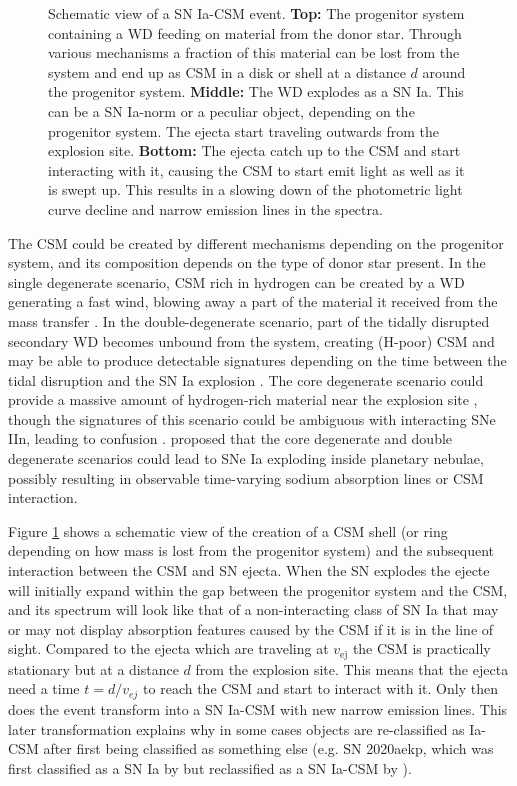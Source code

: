 \documentclass[a4paper,oneside,12pt, class=Latex/Classes/PhDthesisPSnPDF, crop=false]{standalone}
\begin{document}
\begin{figure}
    \caption{Schematic view of a SN Ia-CSM event. \textbf{Top:} The progenitor system containing a WD feeding on material from the donor star. Through various mechanisms a fraction of this material can be lost from the system and end up as CSM in a disk or shell at a distance $d$ around the progenitor system. \textbf{Middle:} The WD explodes as a SN Ia. This can be a SN Ia-norm or a peculiar object, depending on the progenitor system. The ejecta start traveling outwards from the explosion site. \textbf{Bottom:} The ejecta catch up to the CSM and start interacting with it, causing the CSM to start emit light as well as it is swept up. This results in a slowing down of the photometric light curve decline and narrow emission lines in the spectra.}
    \label{Ia-CSM_mod}
\end{figure}

The CSM could be created by different mechanisms depending on the progenitor system, and its composition depends on the type of donor star present. In the single degenerate scenario, CSM rich in hydrogen can be created by a WD generating a fast wind, blowing away a part of the material it received from the mass transfer \citep{single_degen_CSM_gen}. In the double-degenerate scenario, part of the tidally disrupted secondary WD becomes unbound from the system, creating (H-poor) CSM and may be able to produce detectable signatures depending on the time between the tidal disruption and the SN Ia explosion \citep{Double_degen_CSM_gen}. The core degenerate scenario could provide a massive amount of hydrogen-rich material near the explosion site \citep[e.g. for SN 2014J,][]{2014J_core_deg}, though the signatures of this scenario could be ambiguous with interacting SNe IIn, leading to confusion \citep{2012ca_Ia-CSM/IIn}. \citet{snips} proposed that the core degenerate and double degenerate scenarios could lead to SNe Ia exploding inside planetary nebulae, possibly resulting in observable time-varying sodium absorption lines or CSM interaction.

Figure \ref{Ia-CSM_mod} shows a schematic view of the creation of a CSM shell (or ring depending on how mass is lost from the progenitor system) and the subsequent interaction between the CSM and SN ejecta. When the SN explodes the ejecte will initially expand within the gap between the progenitor system and the CSM, and its spectrum will look like that of a non-interacting class of SN Ia that may or may not display absorption features caused by the CSM if it is in the line of sight. Compared to the ejecta which are traveling at $v_\text{ej}$ the CSM is practically stationary but at a distance $d$ from the explosion site. This means that the ejecta need a time $t=d/v_{ej}$ to reach the CSM and start to interact with it. Only then does the event transform into a SN Ia-CSM with new narrow emission lines. This later transformation explains why in some cases objects are re-classified as Ia-CSM after first being classified as something else (e.g. SN 2020aekp, which was first classified as a SN Ia by \citealt{2020aekp_1st_classif} but reclassified as a SN Ia-CSM by \citealt{2020aekp_reclassif}).
\end{document}
